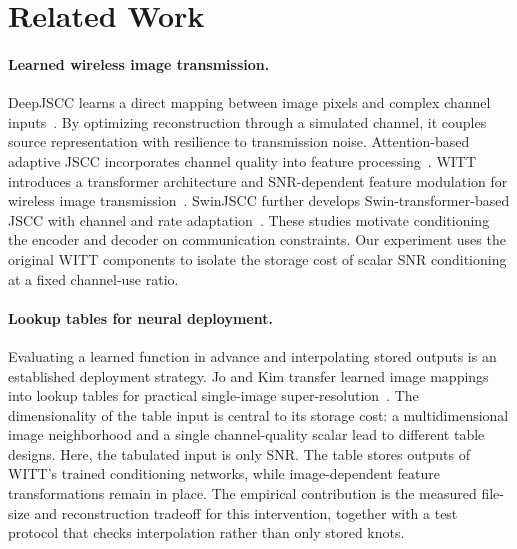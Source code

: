 \section{Related Work}
\paragraph{Learned wireless image transmission.}
DeepJSCC learns a direct mapping between image pixels and complex channel inputs~\cite{bourtsoulatze2019deep}. By optimizing reconstruction through a simulated channel, it couples source representation with resilience to transmission noise. Attention-based adaptive JSCC incorporates channel quality into feature processing~\cite{xu2022adaptive}. WITT introduces a transformer architecture and SNR-dependent feature modulation for wireless image transmission~\cite{yang2023witt}. SwinJSCC further develops Swin-transformer-based JSCC with channel and rate adaptation~\cite{yang2025swinjscc}. These studies motivate conditioning the encoder and decoder on communication constraints. Our experiment uses the original WITT components to isolate the storage cost of scalar SNR conditioning at a fixed channel-use ratio.

\paragraph{Lookup tables for neural deployment.}
Evaluating a learned function in advance and interpolating stored outputs is an established deployment strategy. Jo and Kim transfer learned image mappings into lookup tables for practical single-image super-resolution~\cite{jo2021practical}. The dimensionality of the table input is central to its storage cost: a multidimensional image neighborhood and a single channel-quality scalar lead to different table designs. Here, the tabulated input is only SNR. The table stores outputs of WITT's trained conditioning networks, while image-dependent feature transformations remain in place. The empirical contribution is the measured file-size and reconstruction tradeoff for this intervention, together with a test protocol that checks interpolation rather than only stored knots.
